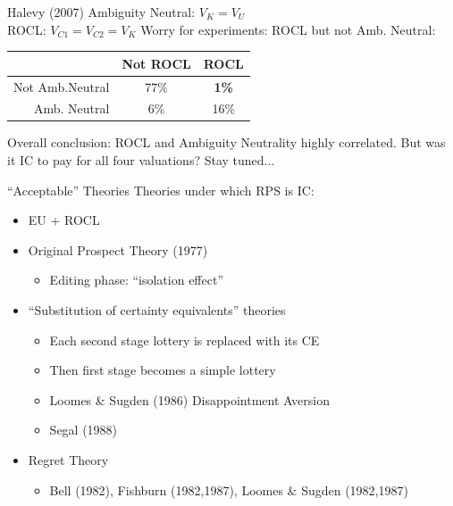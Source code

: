 \begin{frame}{Halevy (2007)}
    Ambiguity Neutral: $V_K=V_U$\\
    ROCL: $V_{C1}=V_{C2}=V_K$
    \br
    Worry for experiments: ROCL but not Amb. Neutral:\\
    \begin{center}
        \begin{tabular}{r|cc}
            & Not ROCL & ROCL \\
            \hline
        Not Amb.Neutral & 77\% & {\color{red}\textbf{1\%}} \\
        Amb. Neutral & 6\% & 16\%
        \end{tabular}
    \end{center}
    \br
    Overall conclusion: ROCL and Ambiguity Neutrality highly correlated.
    \br
    But was it IC to pay for all four valuations? Stay tuned...
\end{frame}

\begin{frame}{``Acceptable'' Theories}
Theories under which RPS is IC:
\begin{itemize}
    \item EU + ROCL
    \item Original Prospect Theory (1977)
    \begin{itemize}
        \item Editing phase: ``isolation effect''
    \end{itemize}
    \item ``Substitution of certainty equivalents'' theories
    \begin{itemize}
        \item Each second stage lottery is replaced with its CE
        \item Then first stage becomes a simple lottery
        \item Loomes \& Sugden (1986) Disappointment Aversion
        \item Segal (1988)
    \end{itemize}
    \item Regret Theory
    \begin{itemize}
        \item Bell (1982), Fishburn (1982,1987), Loomes \& Sugden (1982,1987)
    \end{itemize}
\end{itemize}
    
\end{frame}


